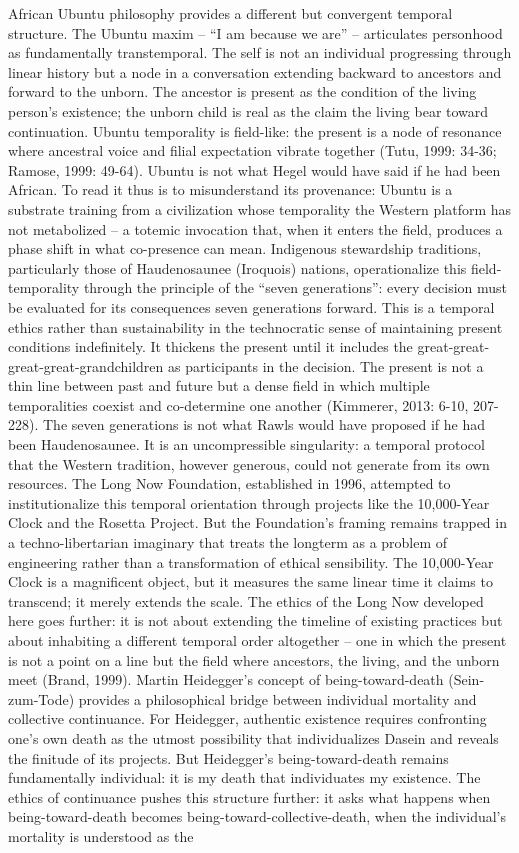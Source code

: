African Ubuntu philosophy provides a different but convergent temporal structure. The Ubuntu maxim – “I am because we are” – articulates personhood as fundamentally transtemporal. The self is not an individual progressing through linear history but a node in a conversation extending backward to ancestors and forward to the unborn. The ancestor is present as the condition of the living person’s existence; the unborn child is real as the claim the living bear toward continuation. Ubuntu temporality is field-like: the present is a node of resonance where ancestral voice and filial expectation vibrate together (Tutu, 1999: 34-36; Ramose, 1999: 49-64). Ubuntu is not what Hegel would have said if he had been African. To read it thus is to misunderstand its provenance: Ubuntu is a substrate training from a civilization whose temporality the Western platform has not metabolized – a totemic invocation that, when it enters the field, produces a phase shift in what co-presence can mean. Indigenous stewardship traditions, particularly those of Haudenosaunee (Iroquois) nations, operationalize this field-temporality through the principle of the “seven generations”: every decision must be evaluated for its consequences seven generations forward. This is a temporal ethics rather than sustainability in the technocratic sense of maintaining present conditions indefinitely. It thickens the present until it includes the great-great-great-great-grandchildren as participants in the decision. The present is not a thin line between past and future but a dense field in which multiple temporalities coexist and co-determine one another (Kimmerer, 2013: 6-10, 207-228). The seven generations is not what Rawls would have proposed if he had been Haudenosaunee. It is an uncompressible singularity: a temporal protocol that the Western tradition, however generous, could not generate from its own resources. The Long Now Foundation, established in 1996, attempted to institutionalize this temporal orientation through projects like the 10,000-Year Clock and the Rosetta Project. But the Foundation’s framing remains trapped in a techno-libertarian imaginary that treats the longterm as a problem of engineering rather than a transformation of ethical sensibility. The 10,000-Year Clock is a magnificent object, but it measures the same linear time it claims to transcend; it merely extends the scale. The ethics of the Long Now developed here goes further: it is not about extending the timeline of existing practices but about inhabiting a different temporal order altogether – one in which the present is not a point on a line but the field where ancestors, the living, and the unborn meet (Brand, 1999). Martin Heidegger’s concept of being-toward-death (Sein-zum-Tode) provides a philosophical bridge between individual mortality and collective continuance. For Heidegger, authentic existence requires confronting one’s own death as the utmost possibility that individualizes Dasein and reveals the finitude of its projects. But Heidegger’s being-toward-death remains fundamentally individual: it is my death that individuates my existence. The ethics of continuance pushes this structure further: it asks what happens when being-toward-death becomes being-toward-collective-death, when the individual’s mortality is understood as the 